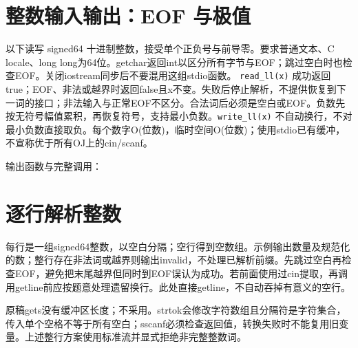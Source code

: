 \newpage
\section{整数输入输出：EOF 与极值}
以下读写 signed64 十进制整数，接受单个正负号与前导零。要求普通文本、C locale、long long为64位。getchar返回int以区分所有字节与EOF；跳过空白时也检查EOF。关闭iostream同步后不要混用这组stdio函数。
\texttt{read\_ll(x)} 成功返回true；EOF、非法或越界时返回false且x不变。失败后停止解析，不提供恢复到下一词的接口；非法输入与正常EOF不区分。合法词后必须是空白或EOF。负数先按无符号幅值累积，再恢复符号，支持最小负数。\texttt{write\_ll(x)} 不自动换行，不对最小负数直接取负。每个数字O(位数)，临时空间O(位数)；使用stdio已有缓冲，不宣称优于所有OJ上的cin/scanf。

\newpage
\noindent 输出函数与完整调用：


\newpage
\section{逐行解析整数}
每行是一组signed64整数，以空白分隔；空行得到空数组。示例输出数量及规范化的数；整行存在非法词或越界则输出invalid，不处理已解析前缀。先跳过空白再检查EOF，避免把末尾越界但同时到EOF误认为成功。若前面使用过cin提取，再调用getline前应按题意处理遗留换行。此处直接getline，不自动吞掉有意义的空行。

原稿gets没有缓冲区长度；不采用。strtok会修改字符数组且分隔符是字符集合，传入单个空格不等于所有空白；sscanf必须检查返回值，转换失败时不能复用旧变量。上述整行方案使用标准流并显式拒绝非完整整数词。
